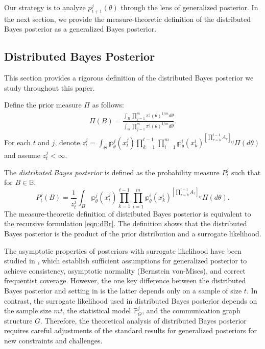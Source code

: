 \documentclass[twoside,11pt]{article}
\numberwithin{equation}{section}
\newcommand{\B}{\mathbb{B}}
\newcommand\bP{\mathbb{P}}
\newcommand\bp{\mathbb{p}}
\begin{document}
{Our strategy is to analyze $p_{t+1}^j(\theta)$ through the lens of generalized posterior. In the next section, we provide the measure-theoretic definition of the distributed Bayes posterior as a generalized Bayes posterior.




\subsection{Distributed Bayes Posterior} 
\label{subsect:distributed-Bayes-posterior}
This section provides a rigorous definition of the distributed Bayes posterior we study throughout this paper. 

Define the prior measure $\Pi$ as follows: 
\begin{align*}
    \Pi(B) = \frac{\int_B \prod_{j = 1}^m \pi^j( \theta)^{1/m} d\theta}{\int_\Theta \prod_{j = 1}^m \pi^j( \theta)^{1/m} d\theta} . 
\end{align*}
For each $t$ and $j$, denote $z_t^j = \int_\Theta \bp_\theta^j(x_t^j) \prod_{k = 1}^{t - 1} \prod_{i = 1}^m \bp_\theta^i(x_k^i)^{\left[\prod_{\tau = k}^{t-1}A_\tau \right]_{ij}}  \Pi(d\theta)$ and assume $z_t^j < \infty$.  

The \textit{distributed Bayes posterior} is defined as the probability measure $P_t^j$ such that for $B \in \B$, 
\begin{equation} \label{def-db-posterior}
    P_{t}^j(B) = \frac{1}{z_t^j}\int_B \bp_\theta^j(x_t^j) \prod_{k = 1}^{t - 1} \prod_{i = 1}^m \bp_\theta^i(x_k^i)^{\left[\prod_{\tau = k}^{t-1}A_\tau \right]_{ij}}  \Pi(d\theta). 
\end{equation}
The measure-theoretic definition of distributed Bayes posterior is equivalent to the recursive formulation \eqref{eqn:dBr}. The definition shows that the distributed Bayes posterior is the product of the prior distribution and a surrogate likelihood. 

The asymptotic properties of posteriors with surrogate likelihood have been studied in \cite{miller2021asymptotic}, which establish sufficient assumptions for generalized posterior to achieve consistency, asymptotic normality (Bernstein von-Mises), and correct frequentist coverage.  However, the one key difference between the distributed Bayes posterior and setting in \citep{miller2021asymptotic} is the latter depends only on a sample of size $t$. In contrast, the surrogate likelihood used in distributed Bayes posterior depends on the sample size $mt$, the statistical model $\bP_\Theta^j$, and the communication graph structure $G$. Therefore, the theoretical analysis of distributed Bayes posterior requires careful adjustments of the standard results for generalized posteriors for new constraints and challenges. 

}
\end{document}
